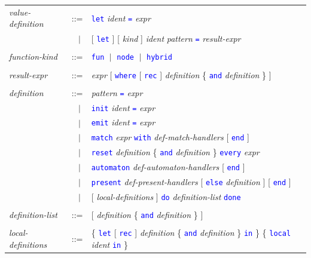 \documentclass[11pt,titlepage,twoside]{report}
\newcommand{\alt}{\;|\;}
\newcommand{\Let}{\mbox{{\tt let}}}
\newcommand{\Rec}{\mbox{{\tt rec}}}
\newcommand{\In}{\mbox{{\tt in}}}
\newcommand{\AND}{\mbox{{\tt and}}}
\renewcommand{\Reset}{\mbox{{\tt reset}}}
\newcommand{\Every}{\mbox{{\tt every}}}
\newcommand{\Where}{\mbox{{\tt where}}}
\newcommand{\term}[1]{\textcolor{Blue}{\tt #1}}
\newcommand{\nterm}[1]{\textcolor{BrickRed}{\it #1}}
\newcommand{\term}[1]{{\tt #1}}
\newcommand{\nterm}[1]{{\em #1}}
\begin{document}
\label{definitions}
\begin{center}
\begin{tabular}{lcl}
\nterm{value-definition}
   & ::=        & \term{let} \nterm{ident} \term{=} \nterm{expr} \\
   & $\;\;\alt$ & [ \term{let} ] [ \nterm{kind} ] \nterm{ident} \nterm{pattern} \term{=}
                    \nterm{result-expr}
\\ \\
\nterm{function-kind} & ::=  & \term{fun} $\alt$ \term{node}
                                              $\alt$ \term{hybrid}
\\ \\
\nterm{result-expr}
& ::=    & \nterm{expr} [ \term{\Where} [ \term{\Rec} ]
  \nterm{definition} \{ \term{\AND} \nterm{definition} \} ]
\\ \\
\nterm{definition} 
& ::=        & \nterm{pattern} \term{=} \nterm{expr} \\
   & $\;\;\alt$ & \term{init} \nterm{ident} \term{=} \nterm{expr} \\
   & $\;\;\alt$ & \term{emit} \nterm{ident} \term{=} \nterm{expr} \\
& $\;\;\alt$ & \term{match} \nterm{expr} \term{with}  
\nterm{def-match-handlers} [ \term{end} ]
\\
& $\;\;\alt$ & \term{\Reset} \nterm{definition}
               \{ \term{\AND} \nterm{definition} \} \term{\Every} \nterm{expr}
                  \\
& $\;\;\alt$ & \term{automaton} \nterm{def-automaton-handlers}
                  [ \term{end} ]
                  \\
& $\;\;\alt$ & \term{present} \nterm{def-present-handlers}
                    [ \term{else} \nterm{definition} ] [ \term{end} ]
                  \\
& $\;\;\alt$ & [ \nterm{local-definitions} ]
                    \term{do} \nterm{definition-list} \term{done}
\\ \\
\nterm{definition-list}
   & ::=        & [ \nterm{definition} \{ \term{\AND}
                  \nterm{definition} \} ]
\\ \\
\nterm{local-definitions}      
   & ::=        & \{ \term{\Let} [ \term{\Rec} ] \nterm{definition}
                  \{ \term{\AND} \nterm{definition} \} \term{\In} \}
                  \{ \term{local} \nterm{ident} \term{in} \}
\end{tabular}
\end{center}
\end{document}

